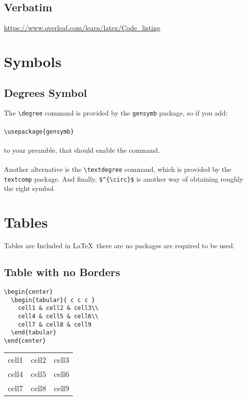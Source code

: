 \documentclass[10pt, letterpaper]{article}
\begin{document}
\subsection{Verbatim}
\url{https://www.overleaf.com/learn/latex/Code_listing}


\section{Symbols}
\subsection{Degrees Symbol}
The \verb|\degree| command is provided by the \verb|gensymb| package, so if you add:\\
\\
\verb|\usepackage{gensymb}|\\
\\
to your preamble, that should enable the command.\\
\\
Another alternative is the \verb|\textdegree| command, which is provided by the \verb|textcomp| package. And finally, \verb|$^{\circ}$| is another way of obtaining roughly the right symbol.


\section{Tables}
Tables are Included in \LaTeX ~there are no packages are required to be used.
\subsection{Table with no Borders}
\begin{multicols}{2}
\lstset{style=basicstyle}
\begin{lstlisting}[]
\begin{center}
  \begin{tabular}{ c c c }
    cell1 & cell2 & cell3\\
    cell4 & cell5 & cell6\\
    cell7 & cell8 & cell9
  \end{tabular}
\end{center}
\end{lstlisting}
\columnbreak
\begin{center}
  \begin{tabular}{ c c c }
    cell1 & cell2 & cell3\\
    cell4 & cell5 & cell6\\
    cell7 & cell8 & cell9
  \end{tabular}
\end{center}
\end{multicols}
\end{document}
